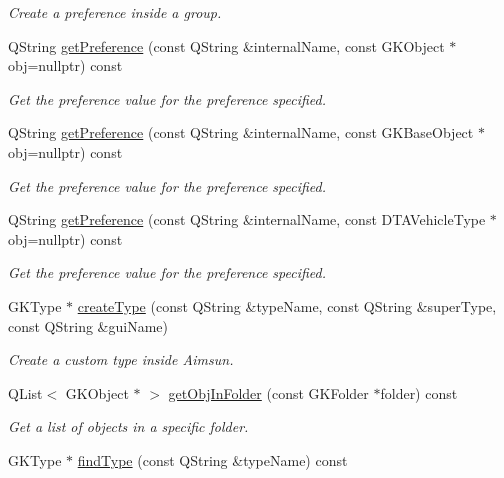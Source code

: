 \begin{DoxyCompactItemize}
\begin{DoxyCompactList}\small\item\em Create a preference inside a group. \end{DoxyCompactList}\item 
Q\+String \hyperlink{classADynamicAPISetup_ad7134069f96f9e5d1e452270ce97260e}{get\+Preference} (const Q\+String \&internal\+Name, const G\+K\+Object $\ast$obj=nullptr) const 
\begin{DoxyCompactList}\small\item\em Get the preference value for the preference specified. \end{DoxyCompactList}\item 
Q\+String \hyperlink{classADynamicAPISetup_ad75bb97185094bad86a6bac41f4ca9ff}{get\+Preference} (const Q\+String \&internal\+Name, const G\+K\+Base\+Object $\ast$obj=nullptr) const 
\begin{DoxyCompactList}\small\item\em Get the preference value for the preference specified. \end{DoxyCompactList}\item 
Q\+String \hyperlink{classADynamicAPISetup_a74a24f10e205e0f9672c2f2610fa6c5b}{get\+Preference} (const Q\+String \&internal\+Name, const D\+T\+A\+Vehicle\+Type $\ast$obj=nullptr) const 
\begin{DoxyCompactList}\small\item\em Get the preference value for the preference specified. \end{DoxyCompactList}\item 
G\+K\+Type $\ast$ \hyperlink{classADynamicAPISetup_a667216f0c397edd3752e76c84d3a7153}{create\+Type} (const Q\+String \&type\+Name, const Q\+String \&super\+Type, const Q\+String \&gui\+Name)
\begin{DoxyCompactList}\small\item\em Create a custom type inside Aimsun. \end{DoxyCompactList}\item 
Q\+List$<$ G\+K\+Object $\ast$ $>$ \hyperlink{classADynamicAPISetup_ac2f277aca863a981eddaa7f0340dc023}{get\+Obj\+In\+Folder} (const G\+K\+Folder $\ast$folder) const 
\begin{DoxyCompactList}\small\item\em Get a list of objects in a specific folder. \end{DoxyCompactList}\item 
G\+K\+Type $\ast$ \hyperlink{classADynamicAPISetup_a04ccb2c6b63e852ada80f5c6fac6305e}{find\+Type} (const Q\+String \&type\+Name) const 

\end{DoxyCompactItemize}
